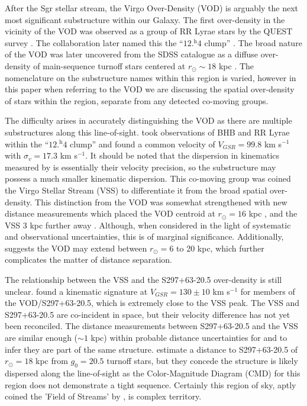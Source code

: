 After the Sgr stellar stream, the Virgo Over-Density (VOD) is arguably the next most significant substructure within our Galaxy. The first over-density in the vicinity of the VOD was observed as a group of RR Lyrae stars by the QUEST survey \citep{Vivas;et-al_2001}. The collaboration later named this the ``$12{\mbox{$.\!\!^{\mathrm h}$}}4$ clump'' \citep{Zinn;et-al_2004}. The broad nature of the VOD was later uncovered from the SDSS catalogue as a diffuse over-density of main-sequence turnoff stars centered at $r_\odot \sim18$ kpc \citep[which ][dubbed as S297+63-20.5]{Newberg;et-al_2002}. The nomenclature on the substructure names within this region is varied, however in this paper when referring to the VOD we are discussing the spatial over-density of stars within the region, separate from any detected co-moving groups.
	
The difficulty arises in accurately distinguishing the VOD as there are multiple substructures along this line-of-sight. \citet{Duffau;et-al_2006} took observations of BHB and RR Lyrae within the ``$12{\mbox{$.\!\!^{\mathrm h}$}}4$ clump'' and found a common velocity of $V_{GSR} = 99.8$ km s$^{-1}$ with $\sigma_{v} = 17.3$ km s$^{-1}$. It should be noted that the dispersion in kinematics measured by \citet{Duffau;et-al_2006} is essentially their velocity precision, so the substructure may possess a much smaller kinematic dispersion. This co-moving group was coined the Virgo Stellar Stream (VSS) to differentiate it from the broad spatial over-density. This distinction from the VOD was somewhat strengthened with new distance measurements which placed the VOD centroid at $r_\odot = 16$ kpc \citep{Juric;et-al_2008, Keller_2010}, and the VSS 3 kpc further away \citep{Duffau;et-al_2006}. Although, when considered in the light of systematic and observational uncertainties, this is of marginal significance. Additionally, \citet{Juric;et-al_2008} suggests the VOD may extend between $r_\odot = 6$ to 20 kpc, which further complicates the matter of distance separation.
 
The relationship between the VSS and the S297+63-20.5 over-density is still unclear. \citet{Newberg;et-al_2007} found a kinematic signature at $V_{GSR} = 130 \pm 10$ km s$^{-1}$ for members of the VOD/S297+63-20.5, which is extremely close to the VSS peak. The VSS and S297+63-20.5 are co-incident in space, but their velocity difference has not yet been reconciled. The distance measurements between S297+63-20.5 and the VSS are similar enough ($\sim1$ kpc) within probable distance uncertainties for \citet{Newberg;et-al_2007} and \citet{Prior;et-al_2009a} to infer they are part of the same structure. \citet{Newberg;et-al_2007} estimate a distance to S297+63-20.5 of $r_\odot = 18$ kpc from $g_0 = 20.5$ turnoff stars, but they concede the structure is likely dispersed along the line-of-sight as the Color-Magnitude Diagram (CMD) for this region does not demonstrate a tight sequence.  Certainly this region of sky, aptly coined the 'Field of Streams' by \citet{Belokurov;et-al_2006}, is complex territory.
	
